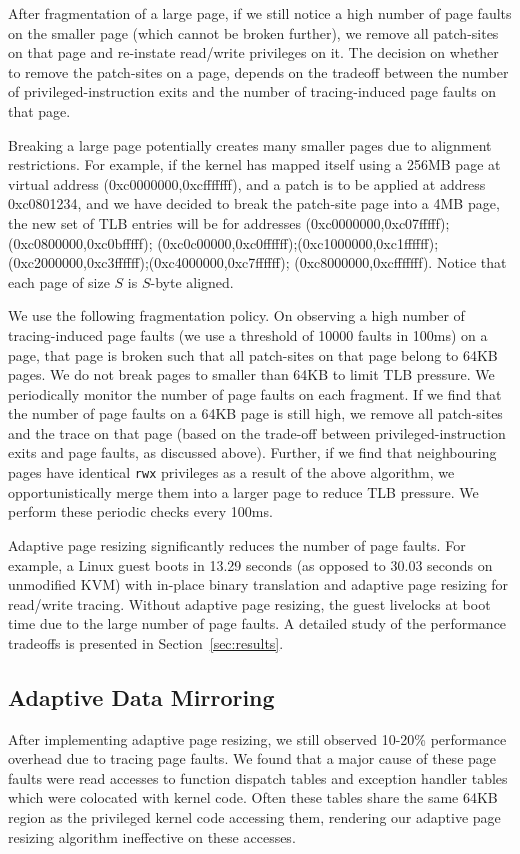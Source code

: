 \documentclass[10pt,twocolumn]{article}
\begin{document}
After fragmentation of a large page, if we still notice a high number of page faults
on the smaller page (which cannot be broken further), we remove all patch-sites
on that page and re-instate read/write privileges on it. The decision on
whether to remove the patch-sites on a page, depends on the tradeoff
between the number of privileged-instruction exits and the number of
tracing-induced page faults on that page.

Breaking a large page potentially creates
many smaller pages due to alignment restrictions.
For example, if the kernel has mapped
itself using a 256MB page at virtual address (0xc0000000,0xcfffffff), and a
patch is to be applied at address 0xc0801234, and we have decided to break
the patch-site page into a 4MB page, the new set of TLB entries will be for
addresses
(0xc0000000,0xc07fffff);(0xc0800000,0xc0bfffff);
(0xc0c00000,0xc0ffffff);(0xc1000000,0xc1ffffff);
(0xc2000000,0xc3ffffff);(0xc4000000,0xc7ffffff);
(0xc8000000,0xcfffffff). Notice that each page of size $S$ is $S$-byte
aligned.

We use the following fragmentation policy. On
observing a high number of tracing-induced page faults (we use a threshold of 10000 faults in
100ms) on a page, that page is broken such that all patch-sites on that page
belong to 64KB pages. We do not break pages to smaller than 64KB to
limit TLB pressure. We periodically monitor the number of page faults on
each fragment. If we find that the number of page faults on a 64KB page is still high,
we remove all patch-sites and the trace on that page (based on the trade-off
between privileged-instruction exits and page faults, as discussed above).
Further, if we find that neighbouring pages have identical {\tt rwx} privileges
as a result of the above algorithm,
we opportunistically merge them into a larger page to reduce TLB pressure. We perform
these periodic checks every 100ms.

Adaptive page resizing significantly reduces the number of page faults. For
example, a Linux guest boots in 13.29 seconds (as opposed to 30.03 seconds on
unmodified KVM) with in-place binary translation
and adaptive page resizing for read/write tracing. Without adaptive page resizing,
the guest livelocks at boot time due to the large number of
page faults. A detailed study of the performance tradeoffs is presented in
Section~\ref{sec:results}.

\subsection{Adaptive Data Mirroring}
After implementing adaptive page resizing,
we still observed 10-20\% performance overhead due
to tracing page faults. We found that a major cause of these page faults were
read accesses to function dispatch tables and exception handler tables which were
colocated with kernel code. Often these tables share
the same 64KB region as the privileged kernel code accessing them, rendering our
adaptive page resizing algorithm ineffective on these accesses.
\end{document}
